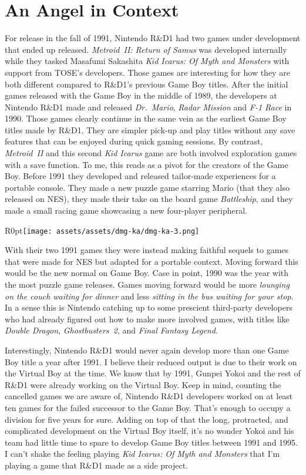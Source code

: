 \documentclass{book}
\begin{document}
\FloatBarrier\section*{An Angel in Context}
For release in the fall of 1991, Nintendo R\&D1 had two games under development that ended up released. \emph{Metroid~II: Return of Samus} was developed internally while they tasked Masafumi Sakashita \emph{Kid Icarus: Of Myth and Monsters} with support from TOSE’s developers. Those games are interesting for how they are both different compared to R\&D1’s previous Game Boy titles. After the initial games released with the Game Boy in the middle of 1989, the developers at Nintendo R\&D1 made and released \emph{Dr.~Mario}, \emph{Radar Mission} and \emph{F-1 Race} in 1990. Those games clearly continue in the same vein as the earliest Game Boy titles made by R\&D1. They are simpler pick-up and play titles without any save features that can be enjoyed during quick gaming sessions. By contrast, \emph{Metroid~II} and this second \emph{Kid Icarus} game are both involved exploration games with a save function. To me, this reads as a pivot for the creators of the Game Boy. Before 1991 they developed and released tailor-made experiences for a portable console. They made a new puzzle game starring Mario (that they also released on NES), they made their take on the board game \emph{Battleship}, and they made a small racing game showcasing a new four-player peripheral.\par
\begin{wrapfigure}{R}{0pt}{\texttt{[image: assets/assets/dmg-ka/dmg-ka-3.png]}}\end{wrapfigure}
With their two 1991 games they were instead making faithful sequels to games that were made for NES but adapted for a portable context. Moving forward this would be the new normal on Game Boy. Case in point, 1990 was the year with the most puzzle game releases. Games moving forward would be more \emph{lounging on the couch waiting for dinner} and less \emph{sitting in the bus waiting for your stop}. In a sense this is Nintendo catching up to some prescient third-party developers who had already figured out how to make more involved games, with titles like \emph{Double Dragon}, \emph{Ghostbusters~2}, and \emph{Final Fantasy Legend}.\par
Interestingly, Nintendo R\&D1 would never again develop more than one Game Boy title a year after 1991. I believe their reduced output is due to their work on the Virtual Boy at the time. We know that by 1991, Gunpei Yokoi and the rest of R\&D1 were already working on the Virtual Boy. Keep in mind, counting the cancelled games we are aware of, Nintendo R\&D1 developers worked on at least ten games for the failed successor to the Game Boy. That’s enough to occupy a division for five years for sure. Adding on top of that the long, protracted, and complicated development on the Virtual Boy itself, it’s no wonder Yokoi and his team had little time to spare to develop Game Boy titles between 1991 and 1995. I can’t shake the feeling playing \emph{Kid Icarus: Of Myth and Monsters} that I’m playing a game that R\&D1 made as a side project.\par
\end{document}
